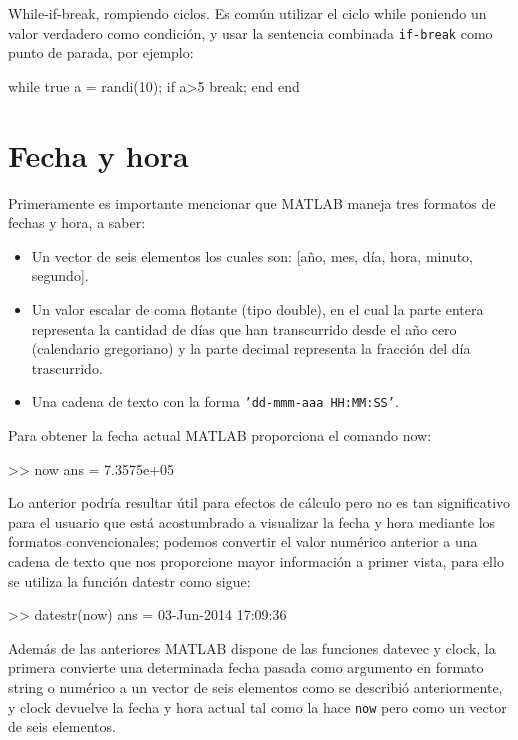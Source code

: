 \begin{informacion}{While-if-break, rompiendo ciclos.}
Es común utilizar el ciclo while poniendo un valor verdadero como condición, y 
usar la sentencia combinada \texttt{if-break} como punto de parada, por ejemplo:

\begin{matlab}
while true
    a = randi(10);
    if a>5
        break;
    end
end
\end{matlab}
\end{informacion}

\section{Fecha y hora}

Primeramente es importante mencionar que MATLAB maneja tres formatos de
fechas y hora, a saber:

\begin{itemize}
\item
  Un vector de seis elementos los cuales son: {[}año, mes, día, hora,
  minuto, segundo{]}.
\item
  Un valor escalar de coma flotante (tipo double), en el cual la parte
  entera representa la cantidad de días que han transcurrido desde el
  año cero (calendario gregoriano) y la parte decimal representa la
  fracción del día trascurrido.
\item
  Una cadena de texto con la forma \texttt{’dd-mmm-aaa\ HH:MM:SS’}.
\end{itemize}

Para obtener la fecha actual MATLAB proporciona el comando now:

\begin{matlab}
>> now
ans =
   7.3575e+05
\end{matlab}

Lo anterior podría resultar útil para efectos de cálculo pero no es tan
significativo para el usuario que está acostumbrado a visualizar la
fecha y hora mediante los formatos convencionales; podemos convertir el
valor numérico anterior a una cadena de texto que nos proporcione mayor
información a primer vista, para ello se utiliza la función datestr como
sigue:

\begin{matlab}
>> datestr(now)
ans =
03-Jun-2014 17:09:36
\end{matlab}

Además de las anteriores MATLAB dispone de las funciones datevec y
clock, la primera convierte una determinada fecha pasada como argumento
en formato string o numérico a un vector de seis elementos como se
describió anteriormente, y clock devuelve la fecha y hora actual tal
como la hace \texttt{now} pero como un vector de seis elementos. \\

